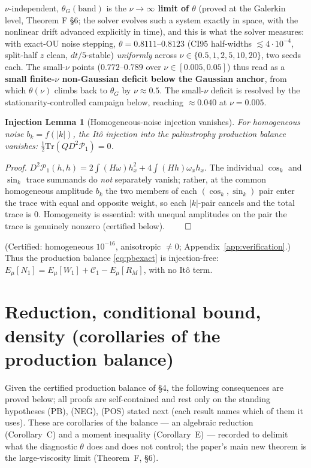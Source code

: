 \documentclass[11pt]{article}
\theoremstyle{remark}
\theoremstyle{plain}
\newtheorem*{lemB0}{Injection Lemma}
\begin{document}
$\nu$-independent, $\theta_G(\text{band})$ is the \textbf{$\nu\to\infty$ limit of
$\theta$} (proved at the Galerkin level, Theorem F \S6; the solver evolves such a
system exactly in space, with the nonlinear drift advanced explicitly in time), and this is what the solver measures: with exact-OU noise stepping,
$\theta = 0.8111$--$0.8123$ (CI95 half-widths $\lesssim4\cdot10^{-4}$, split-half $z$ clean,
$dt/5$-stable) \emph{uniformly} across $\nu \in \{0.5, 1, 2, 5, 10, 20\}$, two seeds each.
The small-$\nu$ points ($0.772$--$0.789$ over $\nu \in [0.005, 0.05]$) thus read as a
\textbf{small finite-$\nu$ non-Gaussian deficit below the Gaussian anchor}, from which
$\theta(\nu)$ climbs back to $\theta_G$ by $\nu \approx 0.5$. The small-$\nu$ deficit is resolved by
the stationarity-controlled campaign below, reaching $\approx 0.040$ at $\nu = 0.005$.

\begin{lemB0}[Homogeneous-noise injection vanishes]
For homogeneous
noise $b_k=f(|k|)$, the It\^o injection into the palinstrophy production balance
vanishes: $\tfrac12\mathrm{Tr}(Q D^2\mathcal{P}_1) = 0$.
\end{lemB0}

\emph{Proof.} $D^2\mathcal{P}_1(h,h) = 2\int(H\omega)h_x^2 + 4\int(Hh)\omega_x h_x$. The
individual $\cos_k$ and $\sin_k$ trace summands do \emph{not} separately vanish; rather,
at the common homogeneous amplitude $b_k$ the two members of each $(\cos_k,\sin_k)$ pair
enter the trace with equal and opposite weight, so each $|k|$-pair cancels and the total
trace is $0$. Homogeneity is essential: with unequal amplitudes on the pair the trace is
genuinely nonzero (certified below). $\qed$

(Certified: homogeneous $10^{-16}$, anisotropic $\ne0$; Appendix~\ref{app:verification}.) Thus the
production balance \eqref{eq:pbexact} is injection-free:
$E_\mu[N_1] = E_\mu[W_1] + \mathcal{C}_1 - E_\mu[R_M]$, with no It\^o term.

\section{Reduction, conditional bound, density (corollaries of the production balance)}

Given the certified production balance of \S4, the following consequences are proved below;
all proofs are self-contained and rest only on the standing hypotheses (PB), (NEG),
(POS) stated next (each result names which of them it uses). These are corollaries of the
balance --- an algebraic reduction (Corollary~C) and a moment inequality (Corollary~E) ---
recorded to delimit what the diagnostic $\theta$ does and does not control; the paper's
main new theorem is the large-viscosity limit (Theorem~F, \S6).
\end{document}
